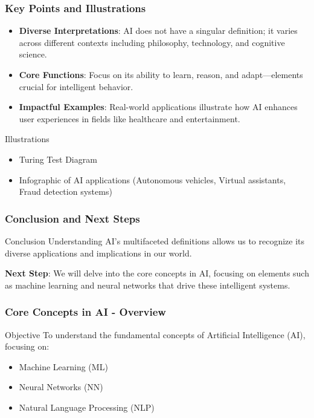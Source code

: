 \documentclass[aspectratio=169]{beamer}
\begin{document}
\begin{frame}[fragile]
    \frametitle{Key Points and Illustrations}
    \begin{itemize}
        \item \textbf{Diverse Interpretations}: AI does not have a singular definition; it varies across different contexts including philosophy, technology, and cognitive science.
        \item \textbf{Core Functions}: Focus on its ability to learn, reason, and adapt—elements crucial for intelligent behavior.
        \item \textbf{Impactful Examples}: Real-world applications illustrate how AI enhances user experiences in fields like healthcare and entertainment.
    \end{itemize}
    
    \begin{block}{Illustrations}
        \begin{itemize}
            \item Turing Test Diagram
            \item Infographic of AI applications (Autonomous vehicles, Virtual assistants, Fraud detection systems)
        \end{itemize}
    \end{block}
\end{frame}

\begin{frame}[fragile]
    \frametitle{Conclusion and Next Steps}
    \begin{block}{Conclusion}
        Understanding AI's multifaceted definitions allows us to recognize its diverse applications and implications in our world. 
    \end{block}
    
    \textbf{Next Step}: We will delve into the core concepts in AI, focusing on elements such as machine learning and neural networks that drive these intelligent systems.
\end{frame}

\begin{frame}[fragile]
    \frametitle{Core Concepts in AI - Overview}
    \begin{block}{Objective}
        To understand the fundamental concepts of Artificial Intelligence (AI), focusing on:
        \begin{itemize}
            \item Machine Learning (ML)
            \item Neural Networks (NN)
            \item Natural Language Processing (NLP)
        \end{itemize}
    \end{block}
\end{frame}
\end{document}
